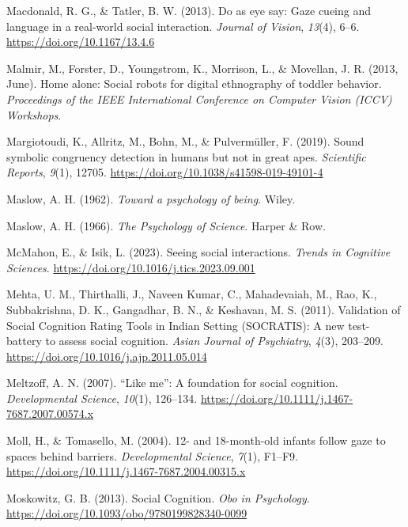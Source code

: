 \documentclass[
]{scrbook}
\newlength{\cslhangindent}
\newenvironment{CSLReferences}[2] %
 {\begin{list}{}{%
  \setlength{\itemindent}{0pt}
  \setlength{\leftmargin}{0pt}
  \setlength{\parsep}{0pt}
  \ifodd #1
   \setlength{\leftmargin}{\cslhangindent}
   \setlength{\itemindent}{-1\cslhangindent}
  \fi
  \setlength{\itemsep}{#2\baselineskip}}}
 {\end{list}}
\begin{document}
\begin{CSLReferences}{1}{0}
Macdonald, R. G., \& Tatler, B. W. (2013). Do as eye say: {Gaze} cueing and language in a real-world social interaction. \emph{Journal of Vision}, \emph{13}(4), 6--6. \url{https://doi.org/10.1167/13.4.6}

Malmir, M., Forster, D., Youngstrom, K., Morrison, L., \& Movellan, J. R. (2013, June). Home alone: {Social} robots for digital ethnography of toddler behavior. \emph{Proceedings of the {IEEE} International Conference on Computer Vision ({ICCV}) Workshops}.

Margiotoudi, K., Allritz, M., Bohn, M., \& Pulvermüller, F. (2019). Sound symbolic congruency detection in humans but not in great apes. \emph{Scientific Reports}, \emph{9}(1), 12705. \url{https://doi.org/10.1038/s41598-019-49101-4}

Maslow, A. H. (1962). \emph{Toward a psychology of being}. Wiley.

Maslow, A. H. (1966). \emph{The {Psychology} of {Science}}. Harper \& Row.

McMahon, E., \& Isik, L. (2023). Seeing social interactions. \emph{Trends in Cognitive Sciences}. \url{https://doi.org/10.1016/j.tics.2023.09.001}

Mehta, U. M., Thirthalli, J., Naveen Kumar, C., Mahadevaiah, M., Rao, K., Subbakrishna, D. K., Gangadhar, B. N., \& Keshavan, M. S. (2011). Validation of {Social Cognition Rating Tools} in {Indian Setting} ({SOCRATIS}): {A} new test-battery to assess social cognition. \emph{Asian Journal of Psychiatry}, \emph{4}(3), 203--209. \url{https://doi.org/10.1016/j.ajp.2011.05.014}

Meltzoff, A. N. (2007). {``{Like} me''}: A foundation for social cognition. \emph{Developmental Science}, \emph{10}(1), 126--134. \url{https://doi.org/10.1111/j.1467-7687.2007.00574.x}

Moll, H., \& Tomasello, M. (2004). 12- and 18-month-old infants follow gaze to spaces behind barriers. \emph{Developmental Science}, \emph{7}(1), F1--F9. \url{https://doi.org/10.1111/j.1467-7687.2004.00315.x}

Moskowitz, G. B. (2013). Social {Cognition}. \emph{Obo in Psychology}. \url{https://doi.org/10.1093/obo/9780199828340-0099}


\end{CSLReferences}
\end{document}
